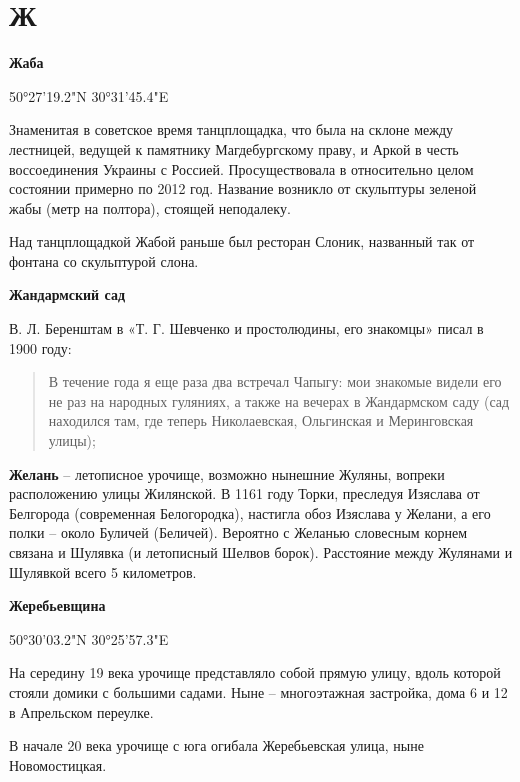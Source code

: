 \chapter*{Ж}

\textbf{Жаба}

50°27'19.2"N 30°31'45.4"E

Знаменитая в советское время танцплощадка, что была на склоне между лестницей, ведущей к памятнику Магдебургскому праву, и Аркой в честь воссоединения Украины с Россией. Просуществовала в относительно целом состоянии  примерно по 2012 год. Название возникло от скульптуры зеленой жабы (метр на полтора), стоящей неподалеку.

Над танцплощадкой Жабой раньше был ресторан Слоник, названный так от фонтана со скульптурой слона.\\

\medskip

\textbf{Жандармский сад} 

В. Л. Беренштам в «Т. Г. Шевченко и простолюдины, его знакомцы» писал в 1900 году:

\begin{quotation}
В течение года я еще раза два встречал Чапыгу: мои знакомые видели его не раз на народных гуляниях, а также на вечерах в Жандармском саду (сад находился там, где теперь Николаевская, Ольгинская и Меринговская улицы);
\end{quotation}


\medskip

\textbf{Желань} – летописное урочище, возможно нынешние Жуляны, вопреки расположению улицы Жилянской. В 1161 году Торки, преследуя Изяслава от Белгорода (современная Белогородка), настигла обоз Изяслава у Желани, а его полки – около Буличей (Беличей). Вероятно с Желанью словесным корнем связана и Шулявка (и летописный Шелвов борок). Расстояние между Жулянами и Шулявкой всего 5 километров.\\ 

\medskip

\textbf{Жеребьевщина}

50°30'03.2"N 30°25'57.3"E

На середину 19 века урочище представляло собой прямую улицу, вдоль которой стояли домики с большими садами. Ныне – многоэтажная застройка, дома 6 и 12 в Апрельском переулке.

В начале 20 века урочище с юга огибала Жеребьевская улица, ныне Новомостицкая.\\

